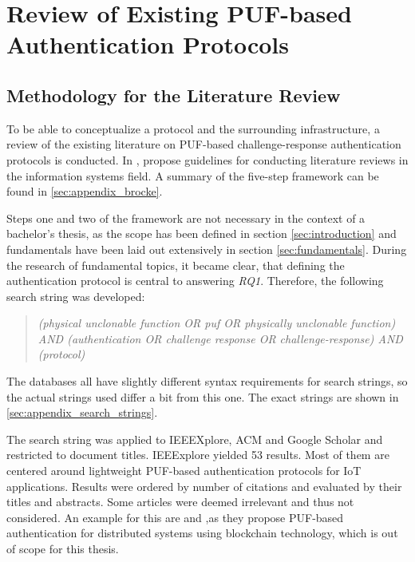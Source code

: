 \newpage
\section{Review of Existing PUF-based Authentication Protocols}
\label{sec:review}

\subsection{Methodology for the Literature Review}
\label{sec:review_methodology}

To be able to conceptualize a protocol and the surrounding infrastructure, a review of the existing literature on
\ac{PUF}-based challenge-response authentication protocols is conducted.
In \cite{Brocke2009}, \citeauthor*{Brocke2009} propose guidelines for conducting literature reviews
in the information systems field. A summary of the five-step framework can be found in \ref{sec:appendix_brocke}.

Steps one and two of the framework are not necessary in the context of a bachelor's thesis, as the scope has been
defined in section \ref{sec:introduction} and fundamentals have been laid out extensively in section \ref{sec:fundamentals}.
During the research of fundamental topics, it became clear, that defining the authentication protocol is central to answering \emph{RQ1}.
Therefore, the following search string was developed:

\begin{quote}
    \emph{(physical unclonable function OR puf OR physically unclonable function) AND (authentication OR challenge response OR challenge-response) AND (protocol)}
\end{quote}

The databases all have slightly different syntax requirements for search strings, so the actual strings used
differ a bit from this one. The exact strings are shown in \ref{sec:appendix_search_strings}.

The search string was applied to IEEEXplore, ACM and Google Scholar and restricted to document titles.
IEEExplore yielded 53 results. Most of them are centered around lightweight PUF-based authentication protocols for \ac{IoT} applications.
Results were ordered by number of citations and evaluated by their titles and abstracts.
Some articles were deemed irrelevant and thus not considered. An example for this are \cite{Zhang2021}
and \cite{Yu2022},as they propose PUF-based authentication for distributed systems using blockchain technology,
which is out of scope for this thesis.

